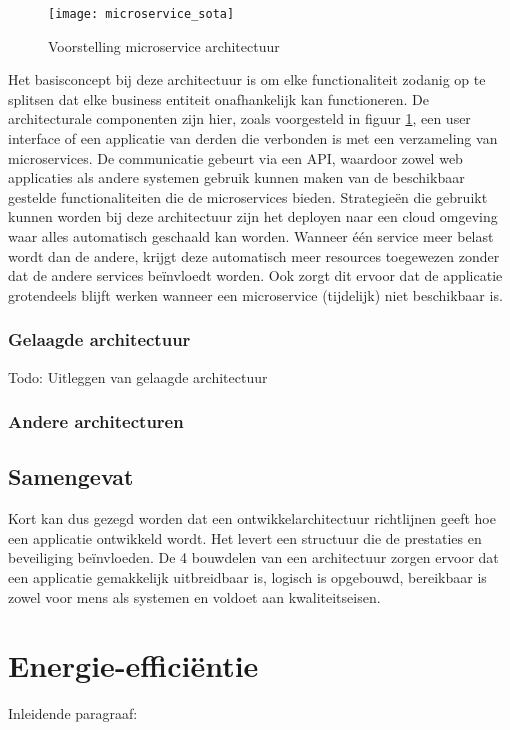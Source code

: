 \begin{figure}[H]
    \texttt{[image: microservice\_sota]}
    \caption{Voorstelling microservice architectuur \autocite{Megargel2020}}
    \label{microservice_sota}
\end{figure}

Het basisconcept bij deze architectuur is om elke functionaliteit zodanig op te splitsen dat elke business entiteit onafhankelijk kan functioneren. De architecturale componenten zijn hier, zoals voorgesteld in figuur \ref{microservice_sota}, een user interface of een applicatie van derden die verbonden is met een verzameling van microservices. De communicatie gebeurt via een API, waardoor zowel web applicaties als andere systemen gebruik kunnen maken van de beschikbaar gestelde functionaliteiten die de microservices bieden. Strategieën die gebruikt kunnen worden bij deze architectuur zijn het deployen naar een cloud omgeving waar alles automatisch geschaald kan worden. Wanneer één service meer belast wordt dan de andere, krijgt deze automatisch meer resources toegewezen zonder dat de andere services beïnvloedt worden. Ook zorgt dit ervoor dat de applicatie grotendeels blijft werken wanneer een microservice (tijdelijk) niet beschikbaar is.

\subsubsection{Gelaagde architectuur}
Todo: Uitleggen van gelaagde architectuur

\subsubsection{Andere architecturen}


\subsection{Samengevat}
Kort kan dus gezegd worden dat een ontwikkelarchitectuur richtlijnen geeft hoe een applicatie ontwikkeld wordt. Het levert een structuur die de prestaties en beveiliging beïnvloeden. De 4 bouwdelen van een architectuur zorgen ervoor dat een applicatie gemakkelijk uitbreidbaar is, logisch is opgebouwd, bereikbaar is zowel voor mens als systemen en voldoet aan kwaliteitseisen.



\section{Energie-efficiëntie}
Inleidende paragraaf: 

